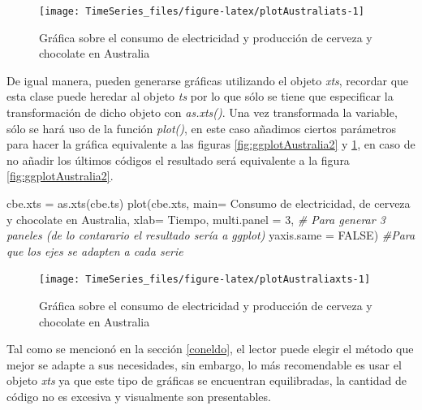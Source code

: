 \documentclass[
  spanish,
]{book}
\newenvironment{Shaded}{\begin{snugshade}}{\end{snugshade}}
\newcommand{\AttributeTok}[1]{\textcolor[rgb]{0.77,0.63,0.00}{#1}}
\newcommand{\CommentTok}[1]{\textcolor[rgb]{0.56,0.35,0.01}{\textit{#1}}}
\newcommand{\ConstantTok}[1]{\textcolor[rgb]{0.00,0.00,0.00}{#1}}
\newcommand{\DecValTok}[1]{\textcolor[rgb]{0.00,0.00,0.81}{#1}}
\newcommand{\FunctionTok}[1]{\textcolor[rgb]{0.00,0.00,0.00}{#1}}
\newcommand{\NormalTok}[1]{#1}
\newcommand{\OtherTok}[1]{\textcolor[rgb]{0.56,0.35,0.01}{#1}}
\newcommand{\StringTok}[1]{\textcolor[rgb]{0.31,0.60,0.02}{#1}}
\theoremstyle{remark}
\begin{document}
\begin{figure}

{\centering \texttt{[image: TimeSeries\_files/figure-latex/plotAustraliats-1]} 

}

\caption{Gráfica sobre el consumo de electricidad y producción de cerveza y chocolate en Australia}\label{fig:plotAustraliats}
\end{figure}

De igual manera, pueden generarse gráficas utilizando el objeto \emph{xts}, recordar que esta clase puede heredar al objeto \emph{ts} por lo que sólo se tiene que especificar la transformación de dicho objeto con \emph{as.xts()}. Una vez transformada la variable, sólo se hará uso de la función \emph{plot()}, en este caso añadimos ciertos parámetros para hacer la gráfica equivalente a las figuras \ref{fig:ggplotAustralia2} y \ref{fig:plotAustraliats}, en caso de no añadir los últimos códigos el resultado será equivalente a la figura \ref{fig:ggplotAustralia2}.

\begin{Shaded}
\begin{Highlighting}[]
\NormalTok{cbe.xts }\OtherTok{=} \FunctionTok{as.xts}\NormalTok{(cbe.ts)}
\FunctionTok{plot}\NormalTok{(cbe.xts, }
     \AttributeTok{main=} \StringTok{\textquotesingle{}Consumo de electricidad, de cerveza y chocolate en Australia\textquotesingle{}}\NormalTok{,}
     \AttributeTok{xlab=} \StringTok{\textquotesingle{}Tiempo\textquotesingle{}}\NormalTok{,}
      \AttributeTok{multi.panel =} \DecValTok{3}\NormalTok{, }\CommentTok{\# Para generar 3 paneles (de lo contarario el resultado sería a ggplot)}
     \AttributeTok{yaxis.same =} \ConstantTok{FALSE}\NormalTok{) }\CommentTok{\#Para que los ejes se adapten a cada serie}
\end{Highlighting}
\end{Shaded}

\begin{figure}

{\centering \texttt{[image: TimeSeries\_files/figure-latex/plotAustraliaxts-1]} 

}

\caption{Gráfica sobre el consumo de electricidad y producción de cerveza y chocolate en Australia}\label{fig:plotAustraliaxts}
\end{figure}

Tal como se mencionó en la sección \ref{coneldo}, el lector puede elegir el método que mejor se adapte a sus necesidades, sin embargo, lo más recomendable es usar el objeto \emph{xts} ya que este tipo de gráficas se encuentran equilibradas, la cantidad de código no es excesiva y visualmente son presentables.
\end{document}
